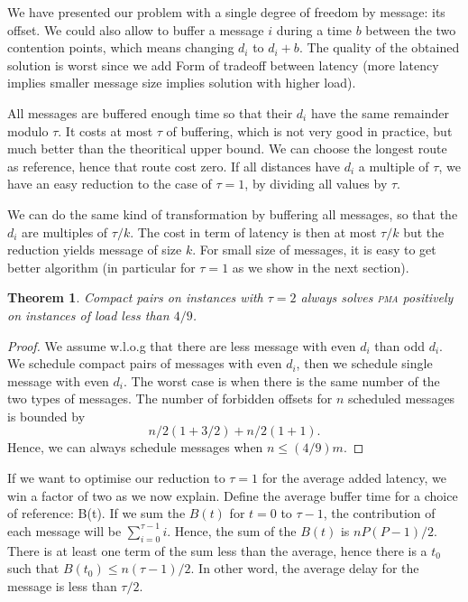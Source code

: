 \documentclass[10pt, conference, letterpaper]{IEEEtran}
\newtheorem{theorem}{Theorem}
\newcommand\pma{\textsc{pma}\xspace}
\begin{document}
We have presented our problem with a single degree of freedom by message: its
offset. We could also allow to buffer a message $i$ during a time $b$ between the two contention points, which means changing $d_i$ to $d_i + b$. The quality of the obtained solution is worst since we add 
Form of tradeoff between latency (more latency implies smaller message size implies
solution with higher load).


All messages are buffered enough time so that their $d_i$ have the same
remainder modulo $\tau$. It costs at most $\tau$ of buffering, which is not
very good in practice, but much better than the theoritical upper bound. We can choose the longest route as reference, hence that route cost zero. 
If all distances have $d_i$ a multiple of $\tau$, we have an
easy reduction to the case of $\tau = 1$, by dividing all values by $\tau$.

We can do the same kind of transformation by buffering all 
messages, so that the $d_i$ are multiples of $\tau / k$. The cost in term
of latency is then at most $\tau / k$ but the reduction yields message of size $k$.
For small size of messages, it is easy to get better algorithm (in particular for $\tau =1$
as we show in the next section).
\begin{theorem}
Compact pairs on instances with $\tau =2$ always solves \pma positively on instances of load less than $4/9$.
\end{theorem}
\begin{proof}
We assume w.l.o.g that there are less message with even $d_i$ than odd $d_i$.
We schedule compact pairs of messages with even $d_i$, then we schedule single message with 
even $d_i$. The worst case is when there is the same number of the two types of messages.
The number of forbidden offsets for $n$ scheduled messages is bounded by 
$$ n/2 (1 + 3/2) + n/2(1 + 1). $$
Hence, we can always schedule messages when $n \leq (4/9)m$.
\end{proof}


If we want to optimise our reduction to $\tau=1$ for the average added latency, we win a factor of two as we now explain.
Define the average buffer time for a choice of reference: B(t). 
If we sum the $B(t)$ for $t=0$ to $\tau-1$, the contribution of each message 
will be $\sum_{i=0}^{\tau-1} i$. Hence, the sum of the $B(t)$ is 
$n P (P-1)/2$. There is at least one term of the sum less than the average,
hence there is a $t_0$ such that $B(t_0) \leq n (\tau-1)/2$. In other word, the average
delay for the message is less than $\tau/2$.
\end{document}
